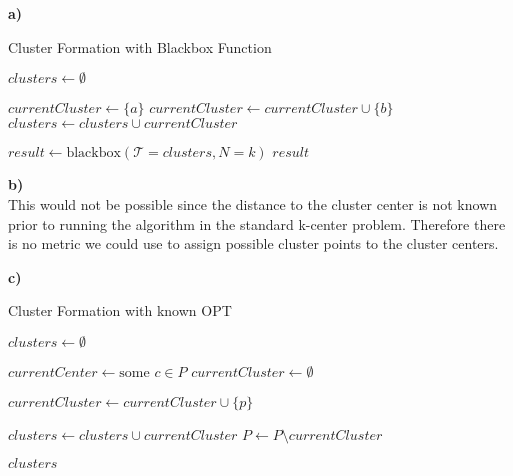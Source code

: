 \documentclass{article}
\begin{document}
\noindent\textbf{a)}\\

\begin{algorithm}
\caption{Cluster Formation with Blackbox Function}
\begin{algorithmic}[1]

\STATE $clusters \leftarrow \emptyset$

    \STATE $currentCluster \leftarrow \{a\}$
            \STATE $currentCluster \leftarrow currentCluster \cup \{b\}$
        \ENDIF
    \ENDFOR
    \STATE $clusters \leftarrow clusters \cup currentCluster$
\ENDFOR

\STATE $result \leftarrow \text{blackbox}(\mathcal{T} = clusters, N = k)$
\RETURN $result$

\end{algorithmic}
\end{algorithm}

\bigskip  %

\noindent\textbf{b)}\\

This would not be possible since the distance to the cluster center is not known prior to running the algorithm in the standard k-center problem. Therefore there is no metric we could use to assign possible cluster points to the cluster centers.

\bigskip  %
\noindent\textbf{c)}\\


\begin{algorithm}
\caption{Cluster Formation with known OPT}
\begin{algorithmic}[1]

\STATE $clusters \leftarrow \emptyset$

    \STATE $currentCenter \leftarrow \text{some } c \in P$
    \STATE $currentCluster \leftarrow \emptyset$
    
            \STATE $currentCluster \leftarrow currentCluster \cup \{p\}$
        \ENDIF
    \ENDFOR
    
    \STATE $clusters \leftarrow clusters \cup currentCluster$
    \STATE $P \leftarrow P \setminus currentCluster$
\ENDWHILE

\RETURN $clusters$

\end{algorithmic}
\end{algorithm}
\end{document}
